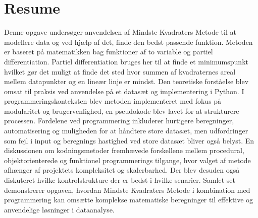 \section*{Resume}
Denne opgave undersøger anvendelsen af Mindste Kvadraters Metode til at modellere data og ved hjælp af det, finde den bedst passende funktion. Metoden er baseret på matematikken bag funktioner af to variable og partiel differentiation. Partiel differentiation bruges her til at finde et minimumspunkt hvilket gør det muligt at finde det sted hvor summen af kvadraternes areal mellem datapunkter og en lineær linje er mindst. Den teoretiske forståelse blev omsat til praksis ved anvendelse på et datasæt og implementering i Python. I programmeringskonteksten blev metoden implementeret med fokus på modularitet og brugervenlighed, en pseudokode blev lavet for at strukturere processen. Fordelene ved programmering inkluderer hurtigere beregninger, automatisering og muligheden for at håndtere store datasæt, men udfordringer som fejl i input og beregnings hastighed ved store datasæt bliver også belyst. En diskussionen om kodningsmetoder fremhævede forskellene mellem procedural, objektorienterede og funktionel programmerings tilgange, hvor valget af metode afhænger af projektets kompleksitet og skalerbarhed. Der blev desuden også diskuteret hvilke kontrolstrukture der er bedst i hvilke senarier. Samlet set demonstrerer opgaven, hvordan Mindste Kvadraters Metode i kombination med programmering kan omsætte komplekse matematiske beregninger til effektive og anvendelige løsninger i dataanalyse. \newpage